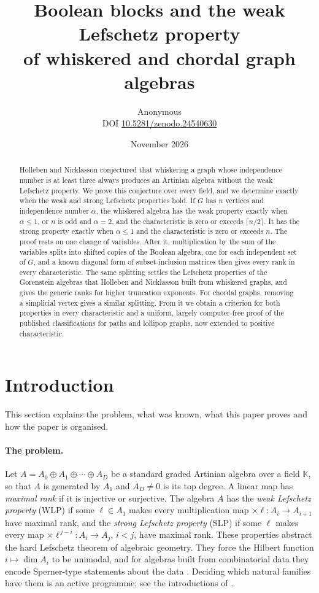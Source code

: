 \documentclass[11pt,a4paper]{article}
\title{Boolean blocks and the weak Lefschetz property\\ of whiskered and chordal graph algebras}
\author{Anonymous\\[3pt]{\small DOI \href{https://doi.org/10.5281/zenodo.24540630}{10.5281/zenodo.24540630}}}
\date{November 2026}
\theoremstyle{definition}
\newcommand{\kk}{\mathbb K}
\begin{document}
\maketitle

\begin{abstract}
Holleben and Nicklasson conjectured that whiskering a graph whose independence number is at least three always produces an Artinian algebra without the weak Lefschetz property. We prove this conjecture over every field, and we determine exactly when the weak and strong Lefschetz properties hold. If $G$ has $n$ vertices and independence number $\alpha$, the whiskered algebra has the weak property exactly when $\alpha\le1$, or $n$ is odd and $\alpha=2$, and the characteristic is zero or exceeds $\lceil n/2\rceil$. It has the strong property exactly when $\alpha\le1$ and the characteristic is zero or exceeds $n$. The proof rests on one change of variables. After it, multiplication by the sum of the variables splits into shifted copies of the Boolean algebra, one for each independent set of $G$, and a known diagonal form of subset-inclusion matrices then gives every rank in every characteristic. The same splitting settles the Lefschetz properties of the Gorenstein algebras that Holleben and Nicklasson built from whiskered graphs, and gives the generic ranks for higher truncation exponents. For chordal graphs, removing a simplicial vertex gives a similar splitting. From it we obtain a criterion for both properties in every characteristic and a uniform, largely computer-free proof of the published classifications for paths and lollipop graphs, now extended to positive characteristic.
\end{abstract}

\section{Introduction}

This section explains the problem, what was known, what this paper proves and how the paper is organised.

\paragraph{The problem.}
Let $A=A_0\oplus A_1\oplus\cdots\oplus A_D$ be a standard graded Artinian algebra over a field $\kk$, so that $A$ is generated by $A_1$ and $A_D\neq0$ is its top degree. A linear map has \emph{maximal rank} if it is injective or surjective. The algebra $A$ has the \emph{weak Lefschetz property} (WLP) if some $\ell\in A_1$ makes every multiplication map $\times\ell:A_i\to A_{i+1}$ have maximal rank, and the \emph{strong Lefschetz property} (SLP) if some $\ell$ makes every map $\times\ell^{\,j-i}:A_i\to A_j$, $i<j$, have maximal rank. These properties abstract the hard Lefschetz theorem of algebraic geometry. They force the Hilbert function $i\mapsto\dim A_i$ to be unimodal, and for algebras built from combinatorial data they encode Sperner-type statements about the data \cite{Stanley}. Deciding which natural families have them is an active programme; see the introductions of \cite{HN,Cooper,NT}.
\end{document}
